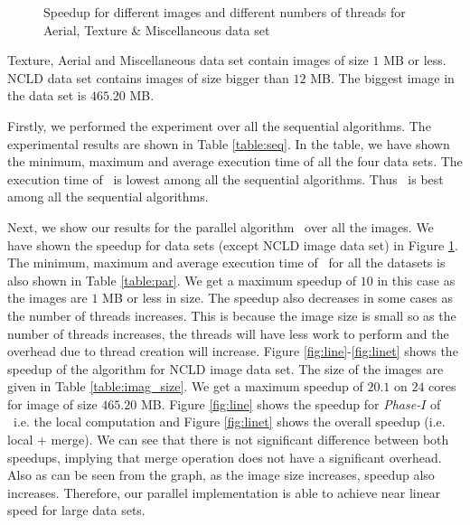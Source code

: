 %
\begin{figure}[h]
\centering
{}
\caption{Speedup for different images and different numbers of threads for
Aerial, Texture \& Miscellaneous data set}
\label{fig:bar}
\end{figure}
Texture, Aerial and Miscellaneous data set contain images of size $1$ MB or less.
NCLD data set contains images of size bigger than $12$ MB. The biggest image in the data set is $465.20$ MB.

Firstly, we performed the experiment over all the sequential algorithms. The
experimental results are shown in Table \ref{table:seq}. In the table, we have
shown the minimum, maximum and average execution time of all the four data sets.
The execution time of \aremsp\ is lowest among all
the sequential algorithms. Thus \aremsp\ is best among all the sequential
algorithms.

Next, we show our results for the parallel algorithm \paremsp\ over all the images.
We have shown the speedup for data sets (except NCLD image data set) in Figure \ref{fig:bar}.
The minimum, maximum and average execution time of \paremsp\ for all the datasets is also shown in Table \ref{table:par}.
We get a maximum speedup of $10$ in this case as the images are $1$ MB or less in size. The speedup also decreases in some cases as the
number of threads increases.
This is because the image size is small so as the number of threads increases,
the threads will have less work to perform and the overhead due to thread
creation will increase.
Figure \ref{fig:line}-\ref{fig:linet} shows the speedup of the algorithm for 
NCLD image data set. The size of the images are given in Table \ref{table:imag_size}.
We get a maximum speedup of $20.1$ on $24$ cores for image of size $465.20$ MB.
Figure \ref{fig:line} shows the speedup for {\em Phase-$I$} of \paremsp\ i.e. 
the local computation and Figure \ref{fig:linet} shows the overall speedup (i.e.
local + merge). We can see that there is not significant difference between both speedups, implying that merge operation
does not have a significant overhead. 
Also as can be seen from the graph, as the image size increases, speedup also
increases. Therefore, our parallel implementation is able to achieve near linear
speed for large data sets.





 

